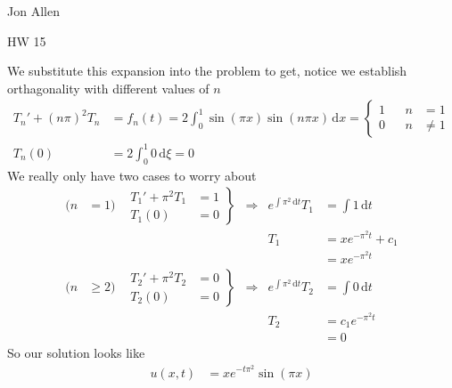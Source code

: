 \documentclass{article}
\begin{document}
Jon Allen

HW 15

We substitute this expansion into the problem to get, notice we establish orthagonality with different values of $n$
\begin{align*}
  T_n'+(n\pi )^2T_n&=f_n(t)=2\int_0^1{\sin(\pi x)\sin(n\pi x)\,\mathrm{d}x}=\left\{
  \begin{aligned}
    1&&n&=1\\
    0&&n&\neq 1
  \end{aligned}\right.\\
  T_n(0)&=2\int_0^1{0\,\mathrm{d}\xi}=0
\end{align*}
We really only have two cases to worry about
\begin{align*}
  (n&=1)&\left.
  \begin{aligned}
    T_1'+\pi^2T_1&=1\\
    T_1(0)&=0
  \end{aligned}
  \right\}&\Rightarrow& e^{\int{\pi ^2\,\mathrm{d}t}}T_1&=\int{1\,\mathrm{d}t}\\
  &&&&T_1&=xe^{-\pi^2t}+c_1\\
  &&&&&=xe^{-\pi^2t}\\
  (n&\geq2)&\left.
  \begin{aligned}
    T_2'+\pi^2T_2&=0\\
    T_2(0)&=0
  \end{aligned}
  \right\}&\Rightarrow& e^{\int{\pi ^2\,\mathrm{d}t}}T_2&=\int{0\,\mathrm{d}t}\\
  &&&&T_2&=c_1e^{-\pi^2t}\\
  &&&&&=0
\end{align*}
So our solution looks like 
\begin{align*}
  u(x,t)&=xe^{-t\pi^2}\sin(\pi x)
\end{align*}
\end{document}
